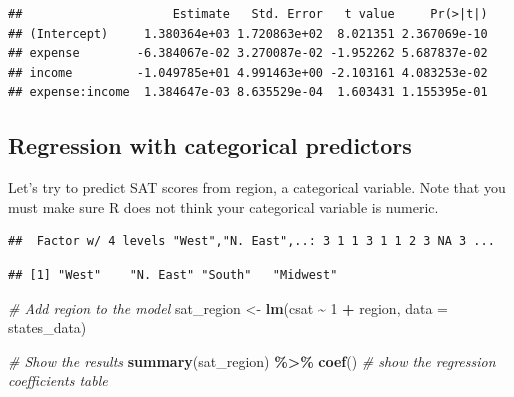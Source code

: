 \documentclass[
]{book}
\newenvironment{Shaded}{\begin{snugshade}}{\end{snugshade}}
\newcommand{\CommentTok}[1]{\textcolor[rgb]{0.56,0.35,0.01}{\textit{#1}}}
\newcommand{\DataTypeTok}[1]{\textcolor[rgb]{0.13,0.29,0.53}{#1}}
\newcommand{\DecValTok}[1]{\textcolor[rgb]{0.00,0.00,0.81}{#1}}
\newcommand{\KeywordTok}[1]{\textcolor[rgb]{0.13,0.29,0.53}{\textbf{#1}}}
\newcommand{\NormalTok}[1]{#1}
\newcommand{\OperatorTok}[1]{\textcolor[rgb]{0.81,0.36,0.00}{\textbf{#1}}}
\newcommand{\StringTok}[1]{\textcolor[rgb]{0.31,0.60,0.02}{#1}}
\begin{document}
\begin{verbatim}
##                     Estimate   Std. Error   t value     Pr(>|t|)
## (Intercept)     1.380364e+03 1.720863e+02  8.021351 2.367069e-10
## expense        -6.384067e-02 3.270087e-02 -1.952262 5.687837e-02
## income         -1.049785e+01 4.991463e+00 -2.103161 4.083253e-02
## expense:income  1.384647e-03 8.635529e-04  1.603431 1.155395e-01
\end{verbatim}

\hypertarget{regression-with-categorical-predictors}{%
\subsection{Regression with categorical predictors}\label{regression-with-categorical-predictors}}

Let's try to predict SAT scores from region, a categorical variable.
Note that you must make sure R does not think your categorical variable is numeric.

\begin{Shaded}
\end{Shaded}

\begin{verbatim}
##  Factor w/ 4 levels "West","N. East",..: 3 1 1 3 1 1 2 3 NA 3 ...
\end{verbatim}

\begin{Shaded}
\end{Shaded}

\begin{verbatim}
## [1] "West"    "N. East" "South"   "Midwest"
\end{verbatim}

\begin{Shaded}
\begin{Highlighting}[]
  \CommentTok{\# Add region to the model}
\NormalTok{  sat\_region \textless{}{-}}\StringTok{ }\KeywordTok{lm}\NormalTok{(csat }\OperatorTok{\textasciitilde{}}\StringTok{ }\DecValTok{1} \OperatorTok{+}\StringTok{ }\NormalTok{region, }\DataTypeTok{data =}\NormalTok{ states\_data) }

  \CommentTok{\# Show the results}
  \KeywordTok{summary}\NormalTok{(sat\_region) }\OperatorTok{\%\textgreater{}\%}\StringTok{ }\KeywordTok{coef}\NormalTok{() }\CommentTok{\# show the regression coefficients table}
\end{Highlighting}
\end{Shaded}
\end{document}
